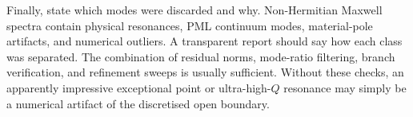 Finally, state which modes were discarded and why.  Non-Hermitian
Maxwell spectra contain physical resonances, PML continuum modes,
material-pole artifacts, and numerical outliers.  A transparent report
should say how each class was separated.  The combination of residual
norms, mode-ratio filtering, branch verification, and refinement sweeps
is usually sufficient.  Without these checks, an apparently impressive
exceptional point or ultra-high-$Q$ resonance may simply be a numerical
artifact of the discretised open boundary.
